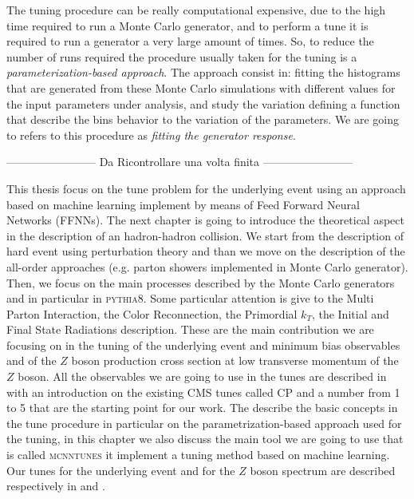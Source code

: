 The tuning procedure can be really computational expensive, due to the high time required to run a Monte Carlo generator, and to perform a tune it is required to run a generator a very large amount of times. So, to reduce the number of runs required the procedure usually taken for the tuning is a \textit{parameterization-based approach}. The approach consist in: fitting the histograms that are generated from these Monte Carlo simulations with different values for the input parameters under analysis, and study the variation defining a function that describe the bins behavior to the variation of the parameters. We are going to refers to this procedure as \textit{fitting the generator response}.


------------------------ Da Ricontrollare una volta finita ------------------------

This thesis focus on the tune problem for the underlying event using an approach based on machine learning implement by means of Feed Forward Neural Networks (FFNNs). 
The next chapter is going to introduce the theoretical aspect in the description of an hadron-hadron collision. We start from the description of hard event using perturbation theory and than we move on the description of the all-order approaches (e.g. parton showers implemented in Monte Carlo generator). Then, we focus on the main processes described by the Monte Carlo generators and in particular in \textsc{pythia8}. Some particular attention is give to the Multi Parton Interaction, the Color Reconnection, the Primordial $k_T$, the Initial and Final State Radiations description. These are the main contribution we are focusing on in the tuning of the underlying event and minimum bias observables and of the $Z$ boson production cross section at low transverse momentum of the $Z$ boson. All the observables we are going to use in the tunes are described in  with an introduction on the existing CMS tunes called CP and a number from 1 to 5 that are the starting point for our work. The  describe the basic concepts in the tune procedure in particular on the parametrization-based approach used for the tuning, in this chapter we also discuss the main tool we are going to use that is called \textsc{mcnntunes} it implement a tuning method based on machine learning. Our tunes for the underlying event and for the $Z$ boson spectrum are described respectively in  and .
 